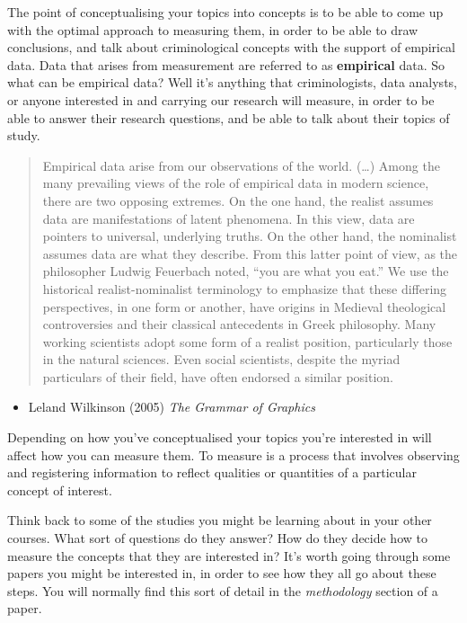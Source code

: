 \documentclass[
]{book}
\providecommand{\tightlist}{%
  \setlength{\itemsep}{0pt}\setlength{\parskip}{0pt}}
\begin{document}
The point of conceptualising your topics into concepts is to be able to come up with the optimal approach to measuring them, in order to be able to draw conclusions, and talk about criminological concepts with the support of empirical data. Data that arises from measurement are referred to as \textbf{empirical} data. So what can be empirical data? Well it's anything that criminologists, data analysts, or anyone interested in and carrying our research will measure, in order to be able to answer their research questions, and be able to talk about their topics of study.

\begin{quote}
Empirical data arise from our observations of the world. (\ldots) Among the many prevailing views of the role of empirical data in modern science, there are two opposing extremes. On the one hand, the realist assumes data are manifestations of latent phenomena. In this view, data are pointers to universal, underlying truths. On the other hand, the nominalist assumes data are what they describe. From this latter point of view, as the philosopher Ludwig Feuerbach noted, ``you are what you eat.'' We use the historical realist-nominalist terminology to emphasize that these differing perspectives, in one form or another, have origins in Medieval theological controversies and their classical antecedents in Greek philosophy. Many working scientists adopt some form of a realist position, particularly those in the natural sciences. Even social scientists, despite the myriad particulars of their field, have often endorsed a similar position.
\end{quote}

\begin{itemize}
\tightlist
\item
  Leland Wilkinson (2005) \emph{The Grammar of Graphics}
\end{itemize}

Depending on how you've conceptualised your topics you're interested in will affect how you can measure them. To measure is a process that involves observing and registering information to reflect qualities or quantities of a particular concept of interest.

Think back to some of the studies you might be learning about in your other courses. What sort of questions do they answer? How do they decide how to measure the concepts that they are interested in? It's worth going through some papers you might be interested in, in order to see how they all go about these steps. You will normally find this sort of detail in the \emph{methodology} section of a paper.
\end{document}
